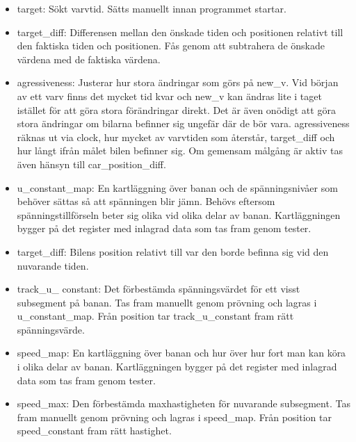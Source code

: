 \begin{itemize}
      \item target: Sökt varvtid. Sätts manuellt innan programmet startar.
      
      \item target\_diff: Differensen mellan den önskade tiden och positionen
        relativt till den faktiska tiden och positionen. Fås genom att
        subtrahera de önskade värdena med de faktiska värdena. 
 
      \item agressiveness: Justerar hur stora ändringar som görs på new\_v. Vid
        början av ett varv finns det mycket tid kvar och new\_v kan ändras lite
        i taget istället för att göra stora förändringar direkt. Det är även
        onödigt att göra stora ändringar om bilarna befinner sig ungefär där de
        bör vara. agressiveness räknas ut via clock, hur mycket av varvtiden
        som återstår, target\_diff och hur långt ifrån målet bilen befinner
        sig. Om gemensam målgång är aktiv tas även hänsyn till
        car\_position\_diff.

      \item u\_constant\_map: En kartläggning över banan och de spänningsnivåer
        som behöver sättas så att spänningen blir jämn. Behövs eftersom
        spänningstillförseln beter sig olika vid olika delar av banan.
        Kartläggningen bygger på det register med inlagrad data som tas fram
        genom tester.
    
      \item target\_diff: Bilens position relativt till var den borde befinna
        sig vid den nuvarande tiden.
      
      \item track\_u\_ constant: Det förbestämda spänningsvärdet för ett visst
        subsegment på banan. Tas fram manuellt genom prövning och lagras i
        u\_constant\_map. Från position tar track\_u\_constant fram rätt
        spänningsvärde.
     
      \item speed\_map: En kartläggning över banan och hur över hur fort man
        kan köra i olika delar av banan. Kartläggningen bygger på det register
        med inlagrad data som tas fram genom tester.

      \item speed\_max: Den förbestämda maxhastigheten för nuvarande
        subsegment. Tas fram manuellt genom prövning och lagras i speed\_map.
        Från position tar speed\_constant fram rätt hastighet. 


\end{itemize}
